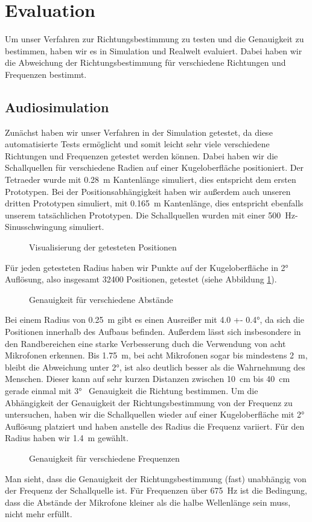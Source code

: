 \section{Evaluation}
Um unser Verfahren zur Richtungsbestimmung zu testen und die Genauigkeit zu bestimmen, haben wir es in Simulation und Realwelt evaluiert. Dabei haben wir die Abweichung der Richtungsbestimmung für verschiedene Richtungen und Frequenzen bestimmt.
\subsection{Audiosimulation}
Zunächst haben wir unser Verfahren in der Simulation getestet, da diese automatisierte Tests ermöglicht und somit leicht sehr viele verschiedene Richtungen und Frequenzen getestet werden können. Dabei haben wir die Schallquellen für verschiedene Radien auf einer Kugeloberfläche positioniert. Der Tetraeder wurde mit \SI{0.28}{\meter} Kantenlänge simuliert, dies entspricht dem ersten Prototypen. Bei der Positionsabhängigkeit haben wir außerdem auch unseren dritten Prototypen simuliert, mit \SI{0.165}{\meter} Kantenlänge, dies entspricht ebenfalls unserem tatsächlichen Prototypen. Die Schallquellen wurden mit einer \SI{500}{\hertz}-Sinusschwingung simuliert.
\begin{figure}[H]
  \centering
  \resizebox{0.7\textwidth}{!}{}
  \caption{Visualisierung der getesteten Positionen\label{fig:pos}}
\end{figure}
Für jeden getesteten Radius haben wir Punkte auf der Kugeloberfläche in \ang{2} Auflösung, also insgesamt \num{32400} Positionen, getestet (siehe Abbildung \ref{fig:pos}).
\begin{figure}[H]
  \centering
  \resizebox{0.750\textwidth}{!}{}
  \caption{Genauigkeit für verschiedene Abstände\label{fig:pos_sweep}}
\end{figure}
Bei einem Radius von \SI{0.25}{\meter} gibt es einen Ausreißer mit \ang[separate-uncertainty = true]{4.0 +- 0.4}, da sich die Positionen innerhalb des Aufbaus befinden. Außerdem lässt sich insbesondere in den Randbereichen eine starke Verbesserung duch die Verwendung von acht Mikrofonen erkennen. Bis \SI{1.75}{\meter}, bei acht Mikrofonen sogar bis mindestens \SI{2}{\meter}, bleibt die Abweichung unter \ang{2}, ist also deutlich besser als die Wahrnehmung des Menschen. Dieser kann auf sehr kurzen Distanzen zwischen \SI{10}{\centi\meter} bis \SI{40}{\centi\meter} gerade einmal mit \ang{3}~\cite{middlebrooks1991sound} Genauigkeit die Richtung bestimmen.
Um die Abhängigkeit der Genauigkeit der Richtungsbestimmung von der Frequenz zu untersuchen, haben wir die Schallquellen wieder auf einer Kugeloberfläche mit \ang{2} Auflösung platziert und haben anstelle des Radius die Frequenz variiert. Für den Radius haben wir \SI{1.4}{\meter} gewählt.
\begin{figure}[H]
  \centering
  
  \caption{Genauigkeit für verschiedene Frequenzen\label{fig:freq_seep}}
\end{figure}
Man sieht, dass die Genauigkeit der Richtungsbestimmung (fast) unabhängig von der Frequenz der Schallquelle ist. Für Frequenzen über \SI{675}{\hertz} ist die Bedingung, dass die Abstände der Mikrofone kleiner als die halbe Wellenlänge sein muss, nicht mehr erfüllt.
